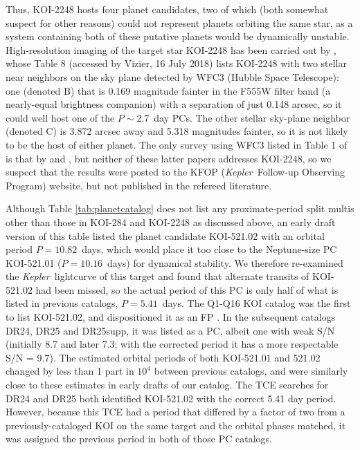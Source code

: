 \documentclass{aastex62}
\newcommand{\ik}{{\it Kepler~}}
\begin{document}
Thus, KOI-2248 hosts four planet candidates, two of which (both somewhat suspect for other reasons) could not represent planets orbiting the same star, as a system containing both of these putative planets would be dynamically unstable. High-resolution imaging of the target star KOI-2248 has been carried out by  \cite{Furlan:2017}, whose Table 8 (accessed by Vizier, 16 July 2018)  lists KOI-2248 with two stellar near neighbors on the sky plane detected by WFC3 (Hubble Space Telescope): one (denoted B) that is 0.169 magnitude fainter in the F555W filter band (a nearly-equal brightness companion) with a separation of just 0.148 arcsec, so it could well host one of the $P \sim 2.7$~day PCs.  The other stellar sky-plane neighbor (denoted C) is 3.872 arcsec away and 5.318 magnitudes fainter, so it is not likely to be the host of either planet. The only survey using WFC3 listed in Table 1 of \cite{Furlan:2017} is that by \cite{Gilliland:2015} and \cite{Cartier:2015}, but neither of these latter papers addresses KOI-2248, so we suspect that the results were posted to the KFOP (\ik Follow-up Observing Program) website, but not published in the refereed literature.

Although Table \ref{tab:planetcatalog} does not list any proximate-period split multis other than those in KOI-284 and KOI-2248 as discussed above, an early draft version of this table listed the planet candidate KOI-521.02 with an orbital period $P = 10.82$~days, which would place it too close to the Neptune-size PC KOI-521.01 ($P = 10.16$~days) for dynamical stability. We therefore re-examined the \ik lightcurve of this target and found that alternate transits of KOI-521.02 had been missed, so the actual period of this PC is only half of what is listed in previous catalogs, $P = 5.41$~days. The Q1-Q16 KOI catalog was the first to list  KOI-521.02, and dispositioned it as an FP \citep{Mullally:2015}.  In the subsequent catalogs DR24, DR25 and DR25supp, it was listed as a PC, albeit one with weak S/N (initially 8.7 and later 7.3; with the corrected period it has a more respectable S/N = 9.7).  The estimated orbital periods of both KOI-521.01 and 521.02 changed by less than 1 part in $10^4$ between previous catalogs, and were similarly close to these estimates in early drafts of our catalog.  The TCE searches for DR24 and DR25 both identified KOI-521.02 with the correct 5.41 day period. However, because this TCE had a period that differed by a factor of two from a previously-cataloged KOI on the same target and the orbital phases matched, it was assigned the previous period in both of those PC catalogs. 
\end{document}

